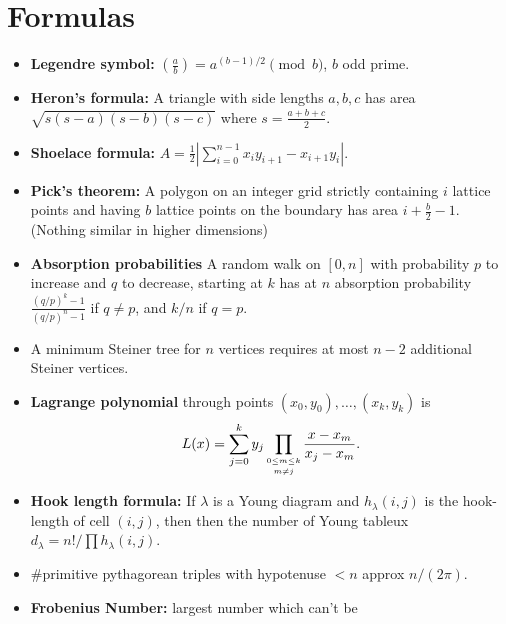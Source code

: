 \documentclass[8pt,a4paper,landscape,oneside]{amsart}
\newenvironment{myitemize}
{\begin{itemize}[leftmargin=.3cm]
	\setlength{\itemsep}{0pt}
	\setlength{\parskip}{0pt}
	\setlength{\parsep}{0pt}     }
{ \end{itemize}                  }
\begin{document}
\begin{multicols*}{3}
\begin{myitemize}
\end{myitemize}

\section{Formulas}


\begin{myitemize}
	\item \textbf{Legendre symbol:} $\left(\frac{a}{b}\right) = a^{(b-1)/2} \pmod{b}$, $b$ odd prime.
	\item \textbf{Heron's formula:} A triangle with side lengths
		$a,b,c$ has area $\sqrt{s(s-a)(s-b)(s-c)}$ where $s =
		\frac{a+b+c}{2}$.
	\item \textbf{Shoelace formula:} $A = \frac12 |\sum_{i=0}^{n-1} x_iy_{i+1} - x_{i+1}y_i|$.
	\item \textbf{Pick's theorem:} A polygon on an integer grid
		strictly containing $i$ lattice points and having $b$ lattice
		points on the boundary has area $i + \frac{b}{2} - 1$. (Nothing
		similar in higher dimensions)
	\item \textbf{Absorption probabilities} A random walk on $[0,n]$ with probability $p$ to increase and $q$ to decrease, starting at $k$ has at $n$ absorption probability $\frac{(q/p)^k-1}{(q/p)^n-1}$ if $q \not= p$, and $k/n$ if $q = p$.
	\item A minimum Steiner tree for $n$ vertices requires at most $n-2$ additional Steiner vertices.
	\item \textbf{Lagrange polynomial} through points $(x_0,y_0),\ldots,(x_k,y_k)$ is
	\[
		L(x) = \sum_{j=0}^k y_j \prod_{\shortstack{$\scriptscriptstyle 0\leq m \leq k$ \\ $\scriptscriptstyle m\neq j$}} \frac{x-x_m}{x_j - x_m}.
	\]
	\item \textbf{Hook length formula:} If $\lambda$ is a Young diagram and $h_{\lambda}(i,j)$ is the hook-length of cell $(i,j)$, then then the number of Young tableux $d_{\lambda} = n!/\prod h_{\lambda}(i,j)$.
	\item \#primitive pythagorean triples with hypotenuse $<n$ approx $n/(2\pi)$.
	\item \textbf{Frobenius Number:} largest number which can't be

\end{myitemize}
\end{multicols*}
\end{document}
